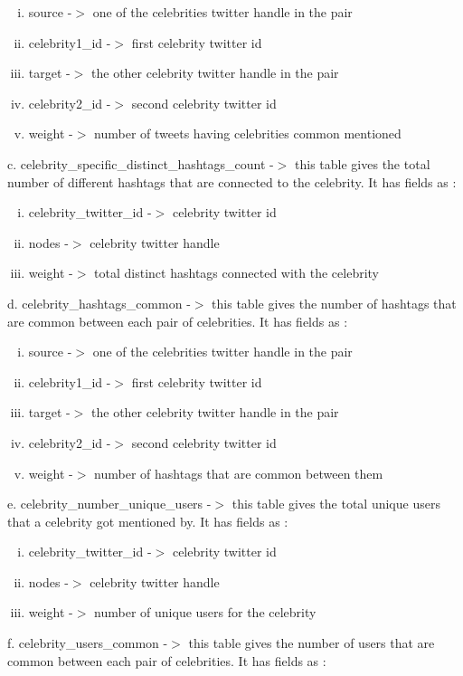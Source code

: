 \documentclass[runningheads,a4paper]{llncs}
\begin{document}
\begin{itemize}
\begin{enumerate}[i.  ]
\addtolength{\itemindent}{1cm}
\item source -$>$ one of the celebrities twitter handle in the pair
\item celebrity1\_id -$>$ first celebrity twitter id
\item target -$>$ the other celebrity twitter handle in the pair
\item celebrity2\_id -$>$ second celebrity twitter id
\item weight -$>$ number of tweets having celebrities common mentioned
\end{enumerate}
\vspace{0.1in}
\subitem  c. celebrity\_specific\_distinct\_hashtags\_count -$>$ this table gives the total number of different hashtags that are connected to the celebrity. It has fields as :

\begin{enumerate}[i.  ]
\addtolength{\itemindent}{1cm}
\item celebrity\_twitter\_id -$>$ celebrity twitter id
\item nodes -$>$ celebrity twitter handle
\item weight -$>$ total distinct hashtags connected with the celebrity
\end{enumerate}
\vspace{0.1in}
\subitem d. celebrity\_hashtags\_common -$>$ this table gives the number of hashtags that are common between each pair of celebrities. It has fields as :

\begin{enumerate}[i.  ]
\addtolength{\itemindent}{1cm}
\item source -$>$ one of the celebrities twitter handle in the pair
\item celebrity1\_id -$>$ first celebrity twitter id
\item target -$>$ the other celebrity twitter handle in the pair
\item celebrity2\_id -$>$ second celebrity twitter id
\item weight -$>$ number of hashtags that are common between them
\end{enumerate}
\vspace{0.1in}
\subitem e. celebrity\_number\_unique\_users -$>$ this table gives the total unique users that a celebrity got mentioned by. It has fields as :

\begin{enumerate}[i.  ]
\addtolength{\itemindent}{1cm}
\item celebrity\_twitter\_id -$>$ celebrity twitter id
\item nodes -$>$ celebrity twitter handle
\item weight -$>$ number of unique users for the celebrity
\end{enumerate}
\vspace{0.1in}
\subitem f. celebrity\_users\_common -$>$ this table gives the number of users that are common between each pair of celebrities. It has fields as :


\end{itemize}
\end{document}
